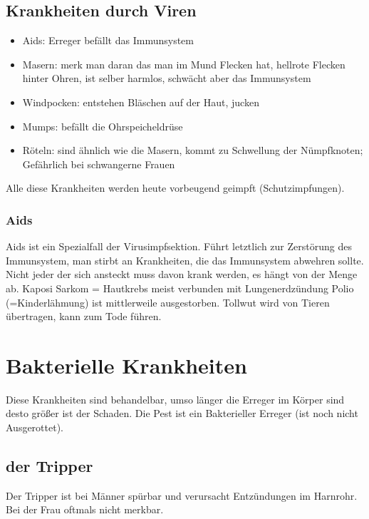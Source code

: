 \documentclass[a4paper]{article}
\begin{document}
\subsection{Krankheiten durch Viren}

\begin{itemize}
\item Aids: Erreger befällt das Immunsystem
\item Masern: merk man daran das man im Mund Flecken hat, hellrote Flecken hinter Ohren, ist selber harmlos, schwächt aber das Immunsystem
\item Windpocken: entstehen Bläschen auf der Haut, jucken
\item Mumps: befällt die Ohrspeicheldrüse
\item Röteln: sind ähnlich wie die Masern, kommt zu Schwellung der Nümpfknoten; Gefährlich bei schwangerne Frauen
\end{itemize}

Alle diese Krankheiten werden heute vorbeugend geimpft (Schutzimpfungen).

\subsubsection{Aids}
Aids ist ein Spezialfall der Virusimpfsektion. Führt letztlich zur Zerstörung des Immunsystem, man stirbt an Krankheiten, die das Immunsystem abwehren sollte.
\newline
\newline
Nicht jeder der sich ansteckt muss davon krank werden, es hängt von der Menge ab. Kaposi Sarkom = Hautkrebs meist verbunden mit Lungenerdzündung Polio (=Kinderlähmung) ist mittlerweile ausgestorben. Tollwut wird von Tieren übertragen, kann zum Tode führen.

\section{Bakterielle Krankheiten}

Diese Krankheiten sind behandelbar, umso länger die Erreger im Körper sind desto größer ist der Schaden. Die Pest ist ein Bakterieller Erreger (ist noch nicht Ausgerottet).

\subsection{der Tripper}
Der Tripper ist bei Männer spürbar und verursacht Entzündungen im Harnrohr. Bei der Frau oftmals nicht merkbar.
\end{document}
